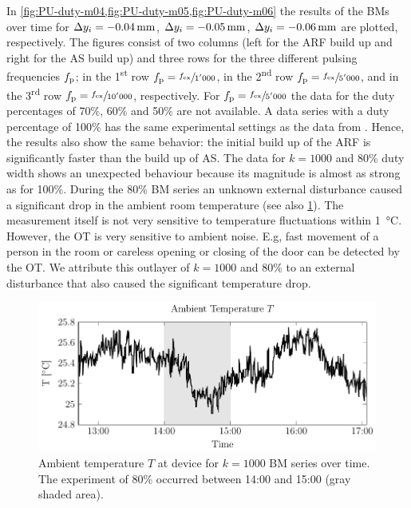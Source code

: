 In \cref{fig:PU-duty-m04,fig:PU-duty-m05,fig:PU-duty-m06} the results of the BMs over 
time for $\Dy_{i}=\SI{-0.04}{\mm}$, $\Dy_{i}=\SI{-0.05}{\mm}$, 
$\Dy_{i}=\SI{-0.06}{\mm}$ are plotted, respectively. The figures consist of two 
columns (left for the ARF build up and right for the AS build up) and three 
rows for the three different pulsing frequencies $f_{\mathrm{p}}$; in the 
1\textsuperscript{st} row $f_{\mathrm{p}}=\sfrac{f_{\mathrm{ex}}}{1'000}$, in the 
2\textsuperscript{nd} row $f_{\mathrm{p}}=\sfrac{f_{\mathrm{ex}}}{5'000}$, and in the 
3\textsuperscript{rd} row $f_{\mathrm{p}}=\sfrac{f_{\mathrm{ex}}}{10'000}$, respectively. For 
$f_{\mathrm{p}}=\sfrac{f_{\mathrm{ex}}}{5'000}$ the data for the duty percentages of 70\%, 60\% and 
50\% are not available. A data series with a duty percentage of 100\% has the 
same experimental settings as the data from \cite{Goering2021}. Hence, the 
results also show the same behavior: the initial build up of the ARF is 
significantly faster than the build up of AS. The data for $k=1000$ and 80\% 
duty width shows an unexpected behaviour because its magnitude is almost as 
strong as for 100\%.  During the 80\% BM series an unknown external disturbance 
caused a significant drop in the ambient room temperature (see also 
\cref{fig:PU-temperature}). The measurement itself is not very sensitive to 
temperature fluctuations within \SI{1}{\degreeCelsius}.  However, the OT is 
very sensitive to ambient noise.  E.g, fast movement of a person in the room or 
careless opening or closing of the door can be detected by the OT.  We 
attribute this outlayer of $k=1000$ and 80\% to an external disturbance that 
also caused the significant temperature drop.

\begin{figure}[tbp]
  \centering
  \includegraphics[]{External/PU-temperature.pdf}
  \caption{Ambient temperature $T$ at device for $k = 1000$ BM series over 
  time.  The experiment of 80\% occurred between 14:00 and 15:00 (gray shaded 
area).}\label{fig:PU-temperature}
\end{figure}

